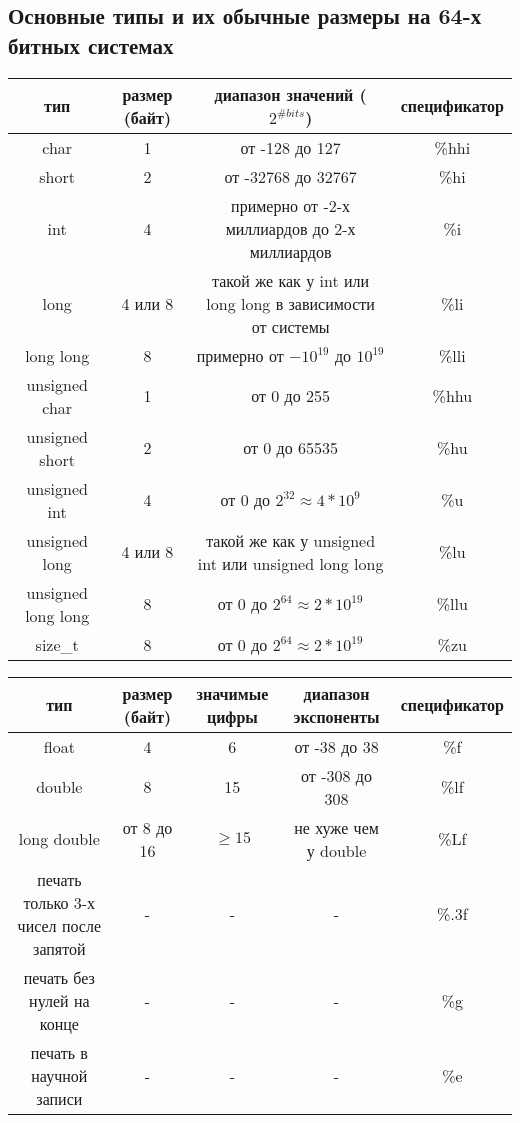 \documentclass{article}
\begin{document}
\subsection*{Основные типы и их обычные размеры на 64-х битных системах}
\begin{center}
\begin{tabular}{ c c c c }
 тип & размер (байт) & диапазон значений ($2^{\# bits}$) & спецификатор \\ \hline
 char & 1 & от -128 до 127 & \%hhi \\ 
 short & 2 & от -32768 до 32767 & \%hi  \\  
 int & 4 & примерно от -2-х миллиардов до 2-х миллиардов & \%i  \\  
 long & 4 или 8 & такой же как у int или long long в зависимости от системы & \%li  \\  
 long long & 8 & примерно от $-10^{19}$ до $10^{19}$ & \%lli  \\  
 unsigned char & 1 & от 0 до 255 & \%hhu \\ 
 unsigned short & 2 & от 0 до 65535 & \%hu  \\  
 unsigned int & 4 & от 0 до $2^{32} \approx 4*10^{9}$ & \%u  \\  
 unsigned long & 4 или 8 & такой же как у unsigned int или unsigned long long & \%lu  \\  
 unsigned long long & 8 & от 0 до $2^{64} \approx 2*10^{19}$  & \%llu  \\  
 size\_t & 8 & от 0 до $2^{64} \approx 2*10^{19}$ & \%zu \\ \hline
\end{tabular}
\end{center}

\begin{center}
\begin{tabular}{ c c c c c }
 тип & размер (байт) & значимые цифры & диапазон экспоненты & спецификатор \\ \hline
 float             & 4          & 6  & от -38 до 38    & \%f \\ 
 double            & 8          & 15 & от -308 до 308  & \%lf  \\  
 long double       & от 8 до 16 & $\ge 15$  & не хуже чем у double  & \%Lf  \\ \hline
 печать только 3-х чисел после запятой & -          & -  & -              & \%.3f \\
 печать без нулей на конце & -          & -  & -              & \%g \\
 печать в научной записи   & -          & -  & -              & \%e \\\hline
\end{tabular}
\end{center}
\end{document}
